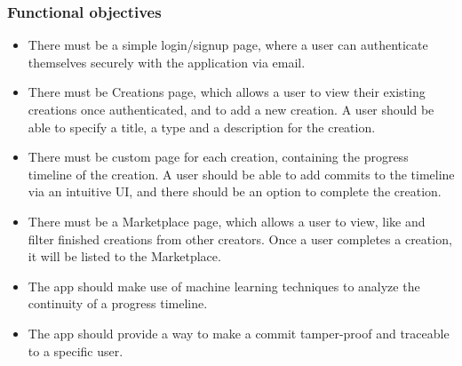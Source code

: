 \documentclass[12pt,a4paper]{article}
\begin{document}
\subsubsection{Functional objectives}
\begin{itemize}
        \item There must be a simple login/signup page, where a user can authenticate themselves securely with the application via email.
        \item There must be Creations page, which allows a user to view their existing creations once authenticated, and to add a new creation. A user should be able to specify a title, a type and a description for the creation.
        \item There must be custom page for each creation, containing the progress timeline of the creation. A user should be able to add commits to the timeline via an intuitive UI, and there should be an option to complete the creation.
        \item There must be a Marketplace page, which allows a user to view, like and filter finished creations from other creators. Once a user completes a creation, it will be listed to the Marketplace.
        \item The app should make use of machine learning techniques to analyze the continuity of a progress timeline.
        \item The app should provide a way to make a commit tamper-proof and traceable to a specific user.
\end{itemize}
\end{document}
